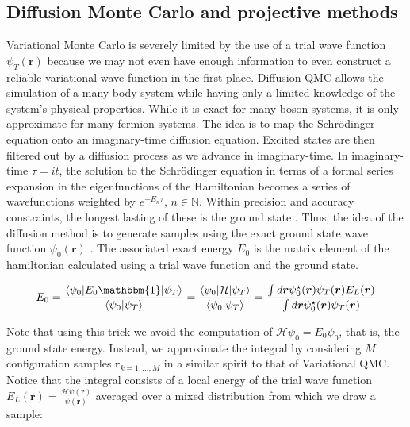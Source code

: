 \subsection{Diffusion Monte Carlo and projective methods}\label{subsec:dmc}

Variational Monte Carlo is severely limited by the use of a trial wave function $\psi_T (\bm r)$ because we may not even have enough information to even construct a reliable variational wave function in the first place.
Diffusion \ac{QMC} allows the simulation of a many-body system while having only a limited knowledge of the system's physical properties.
While it is exact for many-boson systems, it is only approximate for many-fermion systems.
The idea is to map the Schr\"odinger equation onto an imaginary-time diffusion equation.
Excited states are then filtered out by a diffusion process as we advance in imaginary-time.
In imaginary-time $\tau = i t$, the solution to the Schr\"odinger equation in terms of a formal series expansion in the eigenfunctions of the Hamiltonian becomes a series of  wavefunctions weighted by $e^{-E_n \tau}, \, n \in \mathbb{N}$.
Within precision and accuracy constraints, the longest lasting of these is the ground state \cite{kosztin_introduction_1996}.
Thus, the idea of the diffusion method is to generate samples using the exact ground state wave function $\psi_0 (\bm r)$ \cite{toulouse_chapter_2016}.
The associated exact energy $E_0$ is the matrix element of the hamiltonian calculated using a trial wave function and the ground state.

\begin{equation}
E_0 = \frac{ \left\langle \psi_0 |E_0 \mathbbm{1} | \psi_T \right\rangle}{\left\langle \psi_0 | \psi_T \right\rangle} = \frac{\left\langle \psi_0 | \mathcal{H} | \psi_T \right\rangle}{ \left\langle\psi_0 | \psi_T \right\rangle} = \frac{\int d\bm r \psi_0^\star (\bm r) \psi_T (\bm r) E_L (\bm r)}{\int d\bm r\psi_0^\star (\bm r) \psi_T (\bm r)}
\end{equation}

Note that using this trick we avoid the computation of $\mathcal{H} \psi_0 = E_0 \psi_0$, that is, the ground state energy.
Instead, we approximate the integral by considering $M$ configuration samples $\bm r_{k = 1,..., M}$ in a similar spirit to that of Variational \ac{QMC}.
Notice that the integral consists of a local energy of the trial wave function $E_L (\bm r) = \frac{\mathcal{H} \psi (\bm r)}{\psi (\bm r)}$ averaged over a mixed distribution from which we draw a sample:

